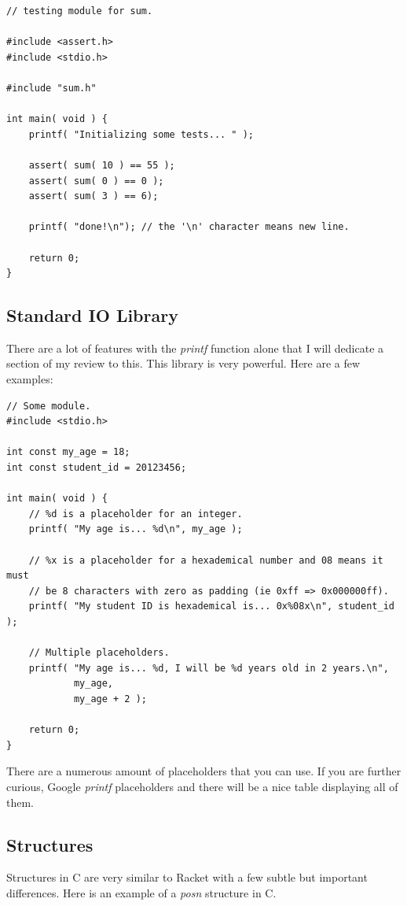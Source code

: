 \documentclass[12pt,extarticle]{article}
\begin{document}
\lstset {
	language=c
}
\begin{lstlisting}
// testing module for sum.

#include <assert.h>
#include <stdio.h>

#include "sum.h"

int main( void ) {
	printf( "Initializing some tests... " );
	
	assert( sum( 10 ) == 55 );
	assert( sum( 0 ) == 0 );
	assert( sum( 3 ) == 6);
	
	printf( "done!\n"); // the '\n' character means new line.
	
	return 0;
}
\end{lstlisting}

\subsection{Standard IO Library}

There are a lot of features with the \emph{printf} function alone that I will dedicate a section of my review to this. This library is very powerful. Here are a few examples:\\

\lstset {
	language=c
}
\begin{lstlisting}
// Some module.
#include <stdio.h>

int const my_age = 18;
int const student_id = 20123456;

int main( void ) {
	// %d is a placeholder for an integer.
	printf( "My age is... %d\n", my_age );
	
	// %x is a placeholder for a hexademical number and 08 means it must
	// be 8 characters with zero as padding (ie 0xff => 0x000000ff).
	printf( "My student ID is hexademical is... 0x%08x\n", student_id );
	
	// Multiple placeholders.
	printf( "My age is... %d, I will be %d years old in 2 years.\n",
	        my_age,
	        my_age + 2 );
	
	return 0;
}
\end{lstlisting}

There are a numerous amount of placeholders that you can use. If you are further curious, Google \emph{printf} placeholders and there will be a nice table displaying all of them.

\subsection{Structures}

Structures in C are very similar to Racket with a few subtle but important differences. Here is an example of a \emph{posn} structure in C.\\
\end{document}
